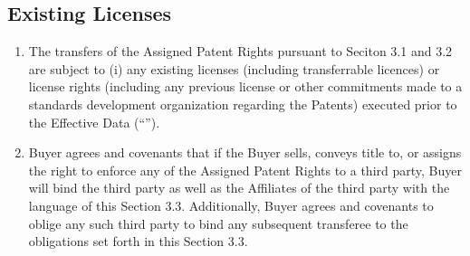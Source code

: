 \documentclass[letterpaper,10pt,openany,oneside,english]{sphinxmanual}
\begin{document}
\subsection{Existing Licenses}
\label{\detokenize{3-transfer:existing-licenses}}\begin{enumerate}
\item {} 
The transfers of the Assigned Patent Rights pursuant to Seciton 3.1 and 3.2 are subject to (i) any existing licenses (including transferrable licences) or license rights (including any previous license or other commitments made to a standards development organization regarding the Patents) executed prior to the Effective Data (“”).

\item {} 
Buyer agrees and covenants that if the Buyer sells, conveys title to, or assigns the right to enforce any of the Assigned Patent Rights to a third party, Buyer will bind the third party as well as the Affiliates of the third party with the language of this Section 3.3. Additionally, Buyer agrees and covenants to oblige any such third party to bind any subsequent transferee to the obligations set forth in this Section 3.3.

\end{enumerate}
\end{document}

